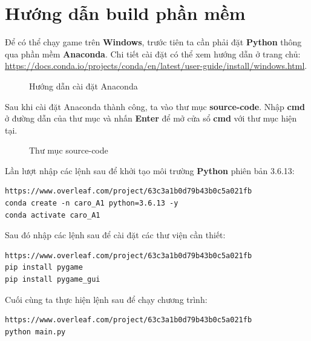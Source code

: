 \section{Hướng dẫn build phần mềm}
Để có thể chạy game trên \textbf{Windows}, trước tiên ta cần phải đặt \textbf{Python} thông qua phần mềm \textbf{Anaconda}. Chi tiết cài đặt có thể xem hướng dẫn ở trang chủ: \url{https://docs.conda.io/projects/conda/en/latest/user-guide/install/windows.html}.
\begin{figure}[H]
\caption{Hướng dẫn cài đặt Anaconda}
\end{figure}
Sau khi cài đặt Anaconda thành công, ta vào thư mục \textbf{source-code}. Nhập \textbf{cmd} ở đường dẫn của thư mục và nhấn \textbf{Enter} để mở cửa sổ \textbf{cmd} với thư mục hiện tại.
\begin{figure}[H]
\caption{Thư mục source-code}
\end{figure}
Lần lượt nhập các lệnh sau để khởi tạo môi trường \textbf{Python} phiên bản 3.6.13:
\begin{lstlisting}https://www.overleaf.com/project/63c3a1b0d79b43b0c5a021fb
conda create -n caro_A1 python=3.6.13 -y
conda activate caro_A1
\end{lstlisting}

Sau đó nhập các lệnh sau để cài đặt các thư viện cần thiết:
\begin{lstlisting}https://www.overleaf.com/project/63c3a1b0d79b43b0c5a021fb
pip install pygame
pip install pygame_gui
\end{lstlisting}

Cuối cùng ta thực hiện lệnh sau để chạy chương trình:
\begin{lstlisting}https://www.overleaf.com/project/63c3a1b0d79b43b0c5a021fb
python main.py
\end{lstlisting}